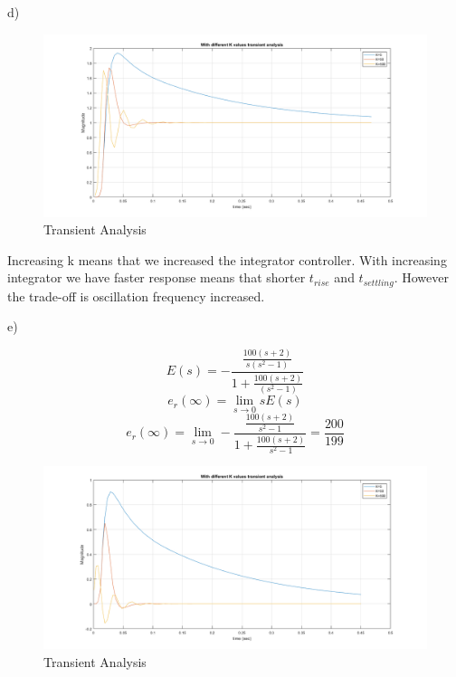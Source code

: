 \documentclass[11pt]{article}
\begin{document}
d)
\begin{figure}[H]
  \includegraphics[scale=0.7, center]{differentk}
  \caption{Transient Analysis}
  \label{fig:zero}
\end{figure}
Increasing k means that we increased the integrator controller. With increasing integrator we have faster response means that shorter $t_{rise}$ and $t_{settling}$. However the trade-off is oscillation frequency increased. 

e)

\[E(s)=-\frac{\frac{100(s+2)}{s(s^2-1)}}{1+\frac{100(s+2)}{(s^2-1)}}\]
$$e_r(\infty)=\lim_{s\to 0} sE(s)$$
$$e_r(\infty)=\lim_{s\to 0} -\frac{\frac{100(s+2)}{s^2-1}}{1+\frac{100(s+2)}{s^2-1}}=\frac{200}{199}$$

\begin{figure}[H]
  \includegraphics[scale=0.7, center]{differentk1}
  \caption{Transient Analysis}
  \label{fig:zero}
\end{figure}
\end{document}
